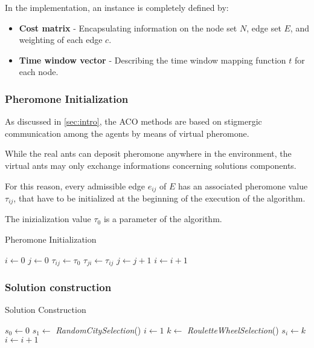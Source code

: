 \begin{homeworkProblem}
In the implementation, an instance is completely defined by:
\begin{itemize}
\item \textbf{Cost matrix} - Encapsulating information on the node set $N$, edge set $E$, and weighting of each edge $c$.
\item \textbf{Time window vector} - Describing the time window mapping function $t$ for each node.
\end{itemize}

\subsubsection{Pheromone Initialization}
As discussed in \ref{sec:intro}, the ACO methods are based on stigmergic communication among the agents by means of virtual pheromone.

While the real ants can deposit pheromone anywhere in the environment, the virtual ants may only exchange informations concerning solutions components.

For this reason, every admissible edge $e_{ij}$ of $E$ has an associated pheromone value $\tau_{ij}$, that have to be initialized at the beginning of the execution of the algorithm.

The inizialization value $\tau_0$ is a parameter of the algorithm.

\begin{algorithm}[!h]
  \caption{Pheromone Initialization}\label{init}
  \begin{algorithmic}[1]
      \State $i \gets 0$
      \State $j \gets 0$
          \State $\tau_{ij} \gets \tau_0$
          \State $\tau_{ji} \gets \tau_{ij}$
          \State $ j \gets j + 1$  
        \EndFor
        \State $ i \gets i + 1$ 
      \EndFor
    \EndProcedure
\end{algorithmic}
\end{algorithm}

\subsubsection{Solution construction}
\begin{algorithm}[!h]
  \caption{Solution Construction}\label{sol}
  \begin{algorithmic}[1]
      \State {}
      \State $s_0 \gets 0$ 
      \State $s_1 \gets$ \emph{RandomCitySelection}() 
      \State $i \gets 1$
        \State $k \gets $ \emph{RouletteWheelSelection}() 
        \State $s_i \gets k$ 
        \State $i \gets i+1$
      \EndWhile
    \EndProcedure
\end{algorithmic}
\end{algorithm}


\end{homeworkProblem}
